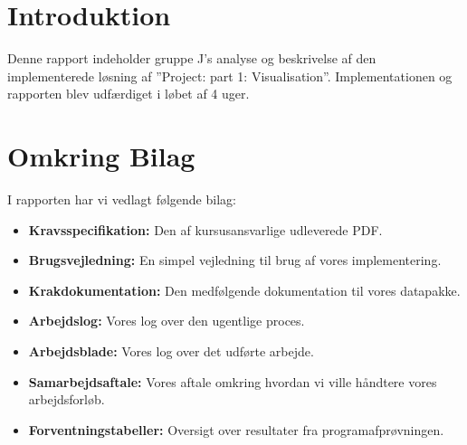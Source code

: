 \section{Introduktion}
Denne rapport indeholder gruppe J's analyse og beskrivelse af den implementerede løsning af ''Project: part 1: Visualisation''. Implementationen og rapporten blev udfærdiget i løbet af 4 uger.
\section{Omkring Bilag}
I rapporten har vi vedlagt følgende bilag:
\begin{itemize}
	\item{\textbf{Kravsspecifikation:} Den af kursusansvarlige udleverede PDF.}
	\item{\textbf{Brugsvejledning:} En simpel vejledning til brug af vores implementering.}
	\item{\textbf{Krakdokumentation:} Den medfølgende dokumentation til vores datapakke.}
	\item{\textbf{Arbejdslog:} Vores log over den ugentlige proces.}
	\item{\textbf{Arbejdsblade:} Vores log over det udførte arbejde.}
	\item{\textbf{Samarbejdsaftale:} Vores aftale omkring hvordan vi ville håndtere vores arbejdsforløb.}
	\item{\textbf{Forventningstabeller:} Oversigt over resultater fra programafprøvningen.}
\end{itemize}

